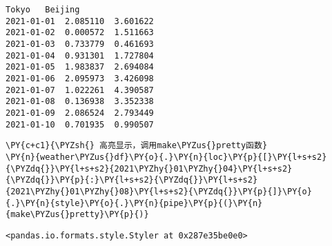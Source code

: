             \begin{tcolorbox}[breakable, size=fbox, boxrule=.5pt, pad at break*=1mm, opacityfill=0]
\begin{Verbatim}[commandchars=\\\{\}]
               Tokyo   Beijing
2021-01-01  2.085110  3.601622
2021-01-02  0.000572  1.511663
2021-01-03  0.733779  0.461693
2021-01-04  0.931301  1.727804
2021-01-05  1.983837  2.694084
2021-01-06  2.095973  3.426098
2021-01-07  1.022261  4.390587
2021-01-08  0.136938  3.352338
2021-01-09  2.086524  2.793449
2021-01-10  0.701935  0.990507
\end{Verbatim}
\end{tcolorbox}
        
    \begin{tcolorbox}[breakable, size=fbox, boxrule=1pt, pad at break*=1mm,colback=cellbackground, colframe=cellborder]
\begin{Verbatim}[commandchars=\\\{\}]
\PY{c+c1}{\PYZsh{} 高亮显示，调用make\PYZus{}pretty函数}
\PY{n}{weather\PYZus{}df}\PY{o}{.}\PY{n}{loc}\PY{p}{[}\PY{l+s+s2}{\PYZdq{}}\PY{l+s+s2}{2021\PYZhy{}01\PYZhy{}04}\PY{l+s+s2}{\PYZdq{}}\PY{p}{:}\PY{l+s+s2}{\PYZdq{}}\PY{l+s+s2}{2021\PYZhy{}01\PYZhy{}08}\PY{l+s+s2}{\PYZdq{}}\PY{p}{]}\PY{o}{.}\PY{n}{style}\PY{o}{.}\PY{n}{pipe}\PY{p}{(}\PY{n}{make\PYZus{}pretty}\PY{p}{)}
\end{Verbatim}
\end{tcolorbox}

            \begin{tcolorbox}[breakable, size=fbox, boxrule=.5pt, pad at break*=1mm, opacityfill=0]
\begin{Verbatim}[commandchars=\\\{\}]
<pandas.io.formats.style.Styler at 0x287e35be0e0>
\end{Verbatim}
\end{tcolorbox}